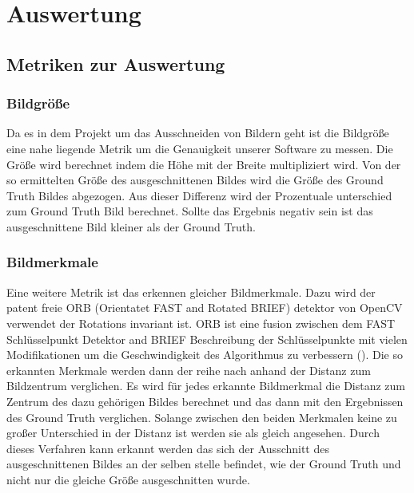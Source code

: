 \chapter{Auswertung}

\section{Metriken zur Auswertung}
\subsection{Bildgröße}
Da es in dem Projekt um das Ausschneiden von Bildern geht ist die Bildgröße eine nahe liegende Metrik um die Genauigkeit unserer Software zu messen. Die Größe wird berechnet indem die Höhe mit der Breite multipliziert wird. Von der so ermittelten Größe des ausgeschnittenen Bildes wird die Größe des Ground Truth Bildes abgezogen. Aus dieser Differenz wird der Prozentuale unterschied zum Ground Truth Bild berechnet. Sollte das Ergebnis negativ sein ist das ausgeschnittene Bild kleiner als der Ground Truth.
   
\subsection{Bildmerkmale}
Eine weitere Metrik ist das erkennen gleicher Bildmerkmale. Dazu wird der patent freie ORB (Orientatet FAST and Rotated BRIEF) detektor von OpenCV verwendet der Rotations invariant ist. ORB ist eine fusion zwischen dem FAST Schlüsselpunkt Detektor and BRIEF Beschreibung der Schlüsselpunkte mit vielen Modifikationen um die Geschwindigkeit des Algorithmus zu verbessern (\cite{OpenCVORB}). Die so erkannten Merkmale werden dann der reihe nach anhand der Distanz zum Bildzentrum verglichen. Es wird für jedes erkannte Bildmerkmal die Distanz zum Zentrum des dazu gehörigen Bildes berechnet und das dann mit den Ergebnissen des Ground Truth verglichen. Solange zwischen den beiden Merkmalen keine zu großer Unterschied in der Distanz ist werden sie als gleich angesehen. Durch dieses Verfahren kann erkannt werden das sich der Ausschnitt des ausgeschnittenen Bildes an der selben stelle befindet, wie der Ground Truth und nicht nur die gleiche Größe ausgeschnitten wurde.

